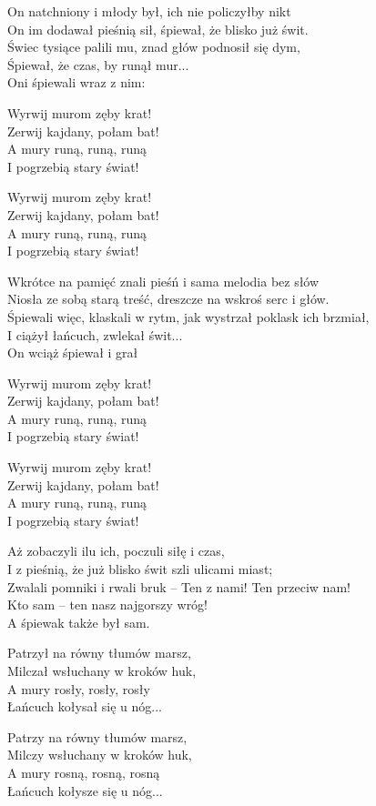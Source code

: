 \begin{text}
    On natchniony i młody był, ich nie policzyłby nikt\\
    On im dodawał pieśnią sił, śpiewał, że blisko już świt.\\
    Świec tysiące palili mu, znad głów podnosił się dym,\\
    Śpiewał, że czas, by runął mur...\\
    Oni śpiewali wraz z nim:

    Wyrwij murom zęby krat!\\
    Zerwij kajdany, połam bat!\\
    A mury runą, runą, runą\\
    I pogrzebią stary świat!

    Wyrwij murom zęby krat!\\
    Zerwij kajdany, połam bat!\\
    A mury runą, runą, runą\\
    I pogrzebią stary świat!

    Wkrótce na pamięć znali pieśń i sama melodia bez słów\\
    Niosła ze sobą starą treść, dreszcze na wskroś serc i głów.\\
    Śpiewali więc, klaskali w rytm, jak wystrzał poklask ich brzmiał,\\
    I ciążył łańcuch, zwlekał świt...\\
    On wciąż śpiewał i grał

    Wyrwij murom zęby krat!\\
    Zerwij kajdany, połam bat!\\
    A mury runą, runą, runą\\
    I pogrzebią stary świat!

    Wyrwij murom zęby krat!\\
    Zerwij kajdany, połam bat!\\
    A mury runą, runą, runą\\
    I pogrzebią stary świat!

    Aż zobaczyli ilu ich, poczuli siłę i czas,\\
    I z pieśnią, że już blisko świt szli ulicami miast;\\
    Zwalali pomniki i rwali bruk – Ten z nami! Ten przeciw nam!\\
    Kto sam – ten nasz najgorszy wróg!\\
    A śpiewak także był sam.

    Patrzył na równy tłumów marsz,\\
    Milczał wsłuchany w kroków huk,\\
    A mury rosły, rosły, rosły\\
    Łańcuch kołysał się u nóg...

    Patrzy na równy tłumów marsz,\\
    Milczy wsłuchany w kroków huk,\\
    A mury rosną, rosną, rosną\\
    Łańcuch kołysze się u nóg...
\end{text}

